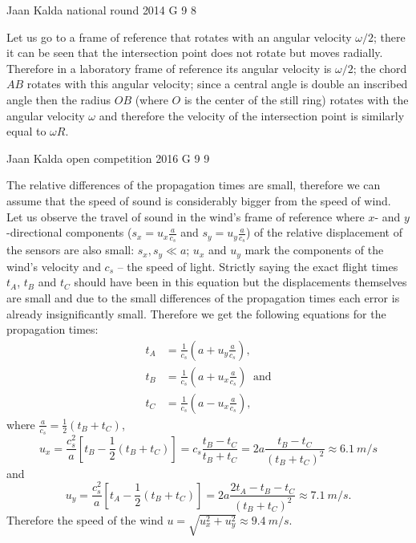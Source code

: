 \documentclass[11pt]{article}
\begin{document}
{Jaan Kalda} %
{national round} %
{2014} %
{G 9} %
{8} %
{

\ifEngSolution
Let us go to a frame of reference that rotates with an angular velocity $\omega/2$; there it can be seen that the intersection point does not rotate but moves radially. Therefore in a laboratory frame of reference its angular velocity is $\omega/2$; the chord $AB$ rotates with this angular velocity; since a central angle is double an inscribed angle then the radius $OB$ (where $O$ is the center of the still ring) rotates with the angular velocity $\omega$ and therefore the velocity of the intersection point is similarly equal to $\omega R$.
\fi
}

{Jaan Kalda} %
{open competition} %
{2016} %
{G 9} %
{9} %
{

\ifEngSolution
The relative differences of the propagation times are small, therefore we can assume that the speed of sound is considerably bigger from the speed of wind. Let us observe the travel of sound in the wind’s frame of reference where $x$- and $y$-directional components ($s_x=u_x\frac a{c_s}$ and $s_y=u_y\frac a{c_s}$) of the relative displacement of the sensors are also small: $s_x, s_y\ll a$; $u_x$ and $u_y$ mark the components of the wind’s velocity and $c_s$ – the speed of light. Strictly saying the exact flight times $t_A$, $t_B$ and $t_C$ should have been in this equation but the displacements themselves are small and due to the small differences of the propagation times each error is already insignificantly small. Therefore we get the following equations for the propagation times:
\begin{align*}
t_A&=\frac 1{c_s}\left(a+u_y\frac a{c_s}\right),\\
t_B&=\frac 1{c_s}\left(a+u_x\frac a{c_s}\right)\;\; \mbox{and}\\
t_C&=\frac 1{c_s}\left(a-u_x\frac a{c_s}\right),
\end{align*}
where $ \frac a{c_s}=\frac 12(t_B+t_C)$,
$$u_x=\frac {c_s^2}a\left[t_B-\frac 12(t_B+t_C)\right]=c_s\frac{t_B-t_C}{t_B+t_C}=2a\frac{t_B-t_C}{(t_B+t_C)^2}\approx \SI{6.1}{m/s}$$
and
$$u_y=\frac {c_s^2}a\left[t_A-\frac 12(t_B+t_C)\right]=2a\frac{2t_A-t_B-t_C}{(t_B+t_C)^2}\approx \SI{7.1}{m/s}.$$
Therefore the speed of the wind $u=\sqrt{u_x^2+u_y^2}\approx \SI{9.4}{m/s}$.
\fi
}
\end{document}
